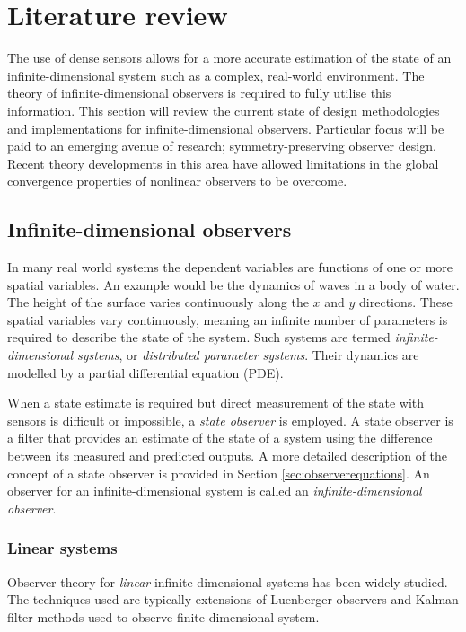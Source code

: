 \section{Literature review} \label{sec:literature}
The use of dense sensors allows for a more accurate estimation of the state of an infinite-dimensional system such as a complex, real-world environment. The theory of infinite-dimensional observers is required to fully utilise this information. This section will review the current state of design methodologies and implementations for infinite-dimensional observers. Particular focus will be paid to an emerging avenue of research; symmetry-preserving observer design. Recent theory developments in this area have allowed limitations in the global convergence properties of nonlinear observers to be overcome.

\subsection{Infinite-dimensional observers}
In many real world systems the dependent variables are functions of one or more spatial variables. An example would be the dynamics of waves in a body of water. The height of the surface varies continuously along the $x$ and $y$ directions. These spatial variables vary continuously, meaning an infinite number of parameters is required to describe the state of the system. Such systems are termed \textit{infinite-dimensional systems}, or \textit{distributed parameter systems}. Their dynamics are modelled by a partial differential equation (PDE). 

When a state estimate is required but direct measurement of the state with sensors is difficult or impossible, a \textit{state observer} is employed. A state observer is a filter that provides an estimate of the state of a system using the difference between its measured and predicted outputs. A more detailed description of the concept of a state observer is provided in Section \ref{sec:observerequations}. An observer for an infinite-dimensional system is called an \textit{infinite-dimensional observer}.

\subsubsection{Linear systems}
Observer theory for \textit{linear} infinite-dimensional systems has been widely studied. The techniques used are typically extensions of Luenberger observers and Kalman filter methods used to observe finite dimensional system.

